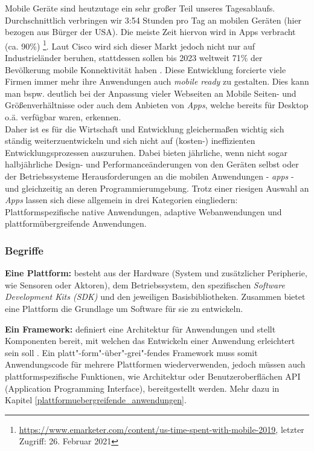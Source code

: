 \label{sec:mobile_development}
Mobile Geräte sind heutzutage ein sehr großer Teil unseres Tagesablaufs. Durchschnittlich verbringen wir 3:54 Stunden pro Tag an mobilen Geräten (hier bezogen aus Bürger der USA). Die meiste Zeit hiervon wird in Apps verbracht (ca. 90\%) \footnote{\url{https://www.emarketer.com/content/us-time-spent-with-mobile-2019}, letzter Zugriff: 26. Februar 2021}.
Laut Cisco wird sich dieser Markt jedoch nicht nur auf Industrieländer beruhen, stattdessen sollen bis 2023 weltweit 71\% der Bevölkerung mobile Konnektivität haben \cite{cisco2020}.
Diese Entwicklung forcierte viele Firmen immer mehr ihre Anwendungen auch \textit{mobile ready} zu gestalten. Dies kann man bspw. deutlich bei der Anpassung vieler Webseiten an Mobile Seiten- und Größenverhältnisse oder auch dem Anbieten von \textit{Apps}, welche bereits für Desktop o.ä. verfügbar waren, erkennen. \\

\noindent
Daher ist es für die Wirtschaft und Entwicklung gleichermaßen wichtig sich ständig weiterzuentwickeln und sich nicht auf (kosten-) ineffizienten Entwicklungsprozessen auszuruhen. Dabei bieten jährliche, wenn nicht sogar halbjährliche Design- und Performanceänderungen von den Geräten selbst oder der Betriebssysteme Herausforderungen an die mobilen Anwendungen - \textit{apps} - und gleichzeitig an deren Programmierumgebung. Trotz einer riesigen Auswahl an \textit{Apps} lassen sich diese allgemein in drei Kategorien eingliedern: Plattformspezifische native Anwendungen, adaptive Webanwendungen und plattformübergreifende Anwendungen.

\subsubsection{Begriffe}
\noindent
{}
\textbf{Eine Plattform:} besteht aus der Hardware (System und zusätzlicher Peripherie, wie Sensoren oder Aktoren), dem Betriebssystem, den spezifischen \textit{Software Development Kits (SDK)} und den jeweiligen Basisbibliotheken. 
Zusammen bietet eine Plattform die Grundlage um Software für sie zu entwickeln.

\noindent
{}
\textbf{Ein Framework:} definiert eine Architektur für Anwendungen und stellt Komponenten bereit, mit welchen das Entwickeln einer Anwendung erleichtert sein soll \cite{johnson1988}.
Ein platt"-form"-über"-grei"-fendes Framework muss somit Anwendungscode für mehrere Plattformen wiederverwenden, jedoch müssen auch plattformspezifische Funktionen, wie Architektur oder Benutzeroberflächen API (Application Programming Interface), bereitgestellt werden. Mehr dazu in Kapitel \ref{plattformuebergreifende_anwendungen}.

